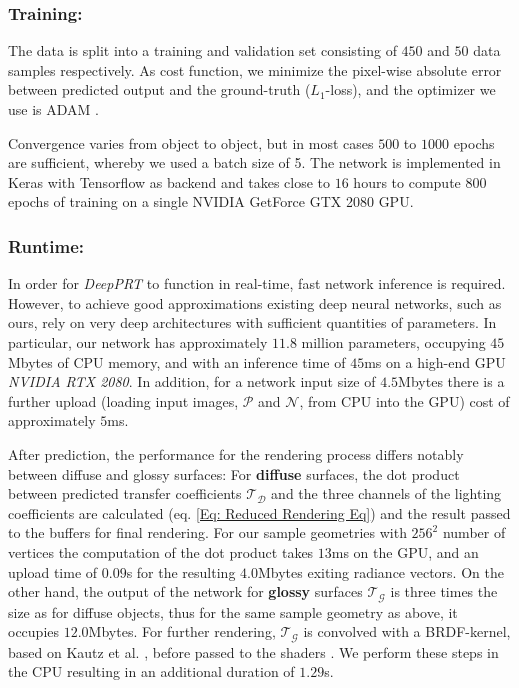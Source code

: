 \subsubsection*{Training: \\} 
The data is split into a training and validation set consisting of $450$ and $50$ data samples respectively. As cost function, we minimize the pixel-wise absolute error between predicted output and the ground-truth ($L_1$-loss), and the optimizer we use is ADAM \cite{ADAM}. 

Convergence varies from object to object, but in most cases $500$ to $1000$ epochs are sufficient, whereby we used a batch size of 5. The network is implemented in Keras with Tensorflow as backend \cite{Keras} and takes close to $16$ hours to compute $800$ epochs of training on a single NVIDIA GetForce GTX 2080 GPU.

\subsubsection*{Runtime: \\}
\label{sec:runtime}
In order for \textit{DeepPRT} to function in real-time, fast network inference is required. However, to achieve good approximations existing deep neural networks, such as ours, rely on very deep architectures with sufficient quantities of parameters. 
In particular, our network has approximately $11.8$ million parameters, occupying $45$Mbytes of CPU memory, and with an inference time of $45$ms on a high-end GPU \textit{NVIDIA RTX 2080}.
In addition, for a network input size of $4.5$Mbytes there is a further upload (loading input images, $\mathcal{P}$ and $\mathcal{N}$, from CPU into the GPU) cost of approximately $5$ms.  

After prediction, the performance for the rendering process differs notably between diffuse and glossy surfaces: 
For \textbf{diffuse} surfaces, the dot product between predicted transfer coefficients $\mathcal{T_D}$ and the three channels of the lighting coefficients are calculated (eq. \ref{Eq: Reduced Rendering Eq}) and the result passed to the buffers for final rendering.  For our sample geometries with $256^2$ number of vertices the computation of the dot product takes $13$ms on the GPU, and an upload time of $0.09$s for the resulting $4.0$Mbytes exiting radiance vectors.
On the other hand, the output of the network for \textbf{glossy} surfaces $\mathcal{T_G}$ is three times the size as for diffuse objects, thus for the same sample geometry as above, it occupies $12.0$Mbytes. For further rendering,  $\mathcal{T_G}$ is convolved with a BRDF-kernel, based on Kautz et al. , before passed to the shaders \cite{sloan2002precomputed}.  We perform these steps in the CPU resulting in an additional duration of $1.29$s. 

